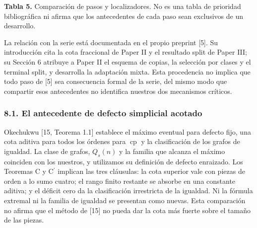 \documentclass[spanish,11pt,a4paper]{article}
\begin{document}
\textbf{Tabla 5.} Comparación de pasos y localizadores. No es una tabla de prioridad bibliográfica ni afirma que los antecedentes de cada paso sean exclusivos de un desarrollo.

La relación con la serie está documentada en el propio preprint {[}5{]}. Su introducción cita la cota fraccional de Paper II y el resultado split de Paper III; su Sección 6 atribuye a Paper II el esquema de copias, la selección por clases y el terminal split, y desarrolla la adaptación mixta. Esta procedencia no implica que todo paso de {[}5{]} sea consecuencia formal de la serie, del mismo modo que compartir esos antecedentes no identifica nuestros dos mecanismos críticos.

\subsubsection{8.1. El antecedente de defecto simplicial acotado}\label{el-antecedente-de-defecto-simplicial-acotado}

Okechukwu {[}15, Teorema 1.1{]} establece el máximo eventual para defecto fijo, una cota aditiva para todos los órdenes para \(\operatorname{cp}\) y la clasificación de los grafos de igualdad. La clase de grafos, \(Q_s(n)\) y la familia que alcanza el máximo coinciden con los nuestros, y utilizamos su definición de defecto enraizado. Los Teoremas C y \texorpdfstring{C\ensuremath{^{\prime}}}{C'} implican las tres cláusulas: la cota superior vale con piezas de orden a lo sumo cuatro; el rango finito restante se absorbe en una constante aditiva; y el déficit cero da la clasificación irrestricta de la igualdad. Ni la fórmula extremal ni la familia de igualdad se presentan como nuevas. Esta comparación no afirma que el método de {[}15{]} no pueda dar la cota más fuerte sobre el tamaño de las piezas.

\end{document}
